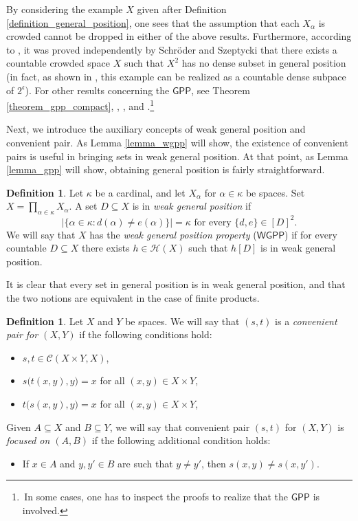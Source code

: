 \documentclass{amsart}
\theoremstyle{plain}
\theoremstyle{definition}
\newtheorem{definition}[theorem]{Definition}
\newcommand{\GPP}{\mathsf{GPP}}
\newcommand{\WGPP}{\mathsf{WGPP}}
\newcommand{\CC}{\mathcal{C}}
\newcommand{\HH}{\mathcal{H}}
\newcommand{\cccc}{\mathfrak{c}}
\begin{document}
By considering the example $X$ given after Definition \ref{definition_general_position}, one sees that the assumption that each $X_\alpha$ is crowded cannot be dropped in either of the above results. Furthermore, according to \cite{gruenhage_natkaniec_piotrowski}, it was proved independently by Schr\"{o}der \cite{schroder} and Szeptycki \cite{szeptycki} that there exists a countable crowded space $X$ such that $X^2$ has no dense subset in general position (in fact, as shown in \cite[Lemma 2.1]{hutchison_gruenhage}, this example can be realized as a countable dense subpace of $2^\cccc$). For other results concerning the $\GPP$, see Theorem \ref{theorem_gpp_compact}, \cite[Theorem 4.5]{dobrowolski_krupski_marciszewski}, \cite[Section 2]{gruenhage_natkaniec_piotrowski}, \cite[Theorem 2.3]{hernandez_gutierrez_arrow} and \cite{medini}.\footnote{\,In some cases, one has to inspect the proofs to realize that the $\GPP$ is involved.}

Next, we introduce the auxiliary concepts of weak general position and convenient pair. As Lemma \ref{lemma_wgpp} will show, the existence of convenient pairs is useful in bringing sets in weak general position. At that point, as Lemma \ref{lemma_gpp} will show, obtaining general position is fairly straightforward.

\begin{definition}\label{definition_weak_general_position}
Let $\kappa$ be a cardinal, and let $X_\alpha$ for $\alpha\in\kappa$ be spaces. Set $X=\prod_{\alpha\in\kappa}X_\alpha$. A set $D\subseteq X$ is in \emph{weak general position} if
$$
|\{\alpha\in\kappa:d(\alpha)\neq e(\alpha)\}|=\kappa\text{ for every }\{d,e\}\in [D]^2.
$$
We will say that $X$ has the \emph{weak general position property} ($\WGPP$) if for every countable $D\subseteq X$ there exists $h\in\HH(X)$ such that $h[D]$ is in weak general position.
\end{definition}

It is clear that every set in general position is in weak general position, and that the two notions are equivalent in the case of finite products.

\begin{definition}\label{definition_convenient_pair}
Let $X$ and $Y$ be spaces. We will say that $(s,t)$ is a \emph{convenient pair for $(X,Y)$} if the following conditions hold:
\begin{itemize}
\item $s,t\in\CC(X\times Y,X)$,
\item $s\big(t(x,y),y\big)=x$ for all $(x,y)\in X\times Y$,
\item $t\big(s(x,y),y\big)=x$ for all $(x,y)\in X\times Y$,
\end{itemize}
Given $A\subseteq X$ and $B\subseteq Y$, we will say that convenient pair $(s,t)$ for $(X,Y)$ is \emph{focused on $(A,B)$} if the following additional condition holds:
\begin{itemize}
\item If $x\in A$ and $y,y'\in B$ are such that $y\neq y'$, then $s(x,y)\neq s(x,y')$.
\end{itemize}
\end{definition}
\end{document}
